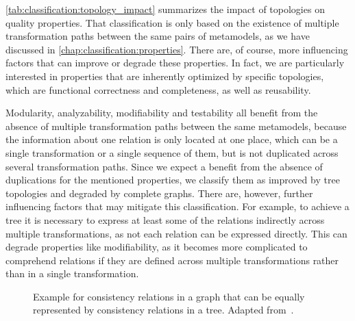 \autoref{tab:classification:topology_impact} summarizes the impact of topologies on quality properties.
That classification is only based on the existence of multiple transformation paths between the same pairs of metamodels, as we have discussed in \autoref{chap:classification:properties}.
There are, of course, more influencing factors that can improve or degrade these properties.
In fact, we are particularly interested in properties that are inherently optimized by specific topologies, which are functional correctness and completeness, as well as reusability.

Modularity, analyzability, modifiability and testability all benefit from the absence of multiple transformation paths between the same metamodels, because the information about one relation is only located at one place, which can be a single transformation or a single sequence of them, but is not duplicated across several transformation paths.
Since we expect a benefit from the absence of duplications for the mentioned properties, we classify them as improved by tree topologies and degraded by complete graphs.
There are, however, further influencing factors that may mitigate this classification.
For example, to achieve a tree it is necessary to express at least some of the relations indirectly across multiple transformations, as not each relation can be expressed directly.
This can degrade properties like modifiability, as it becomes more complicated to comprehend relations if they are defined across multiple transformations rather than in a single transformation.

\begin{figure}
    \centering
    
    \caption[Equality of graph and tree of consistency relations]{Example for consistency relations in a graph that can be equally represented by consistency relations in a tree. Adapted from~.}
    \label{fig:classification:tree_generation}
\end{figure}

